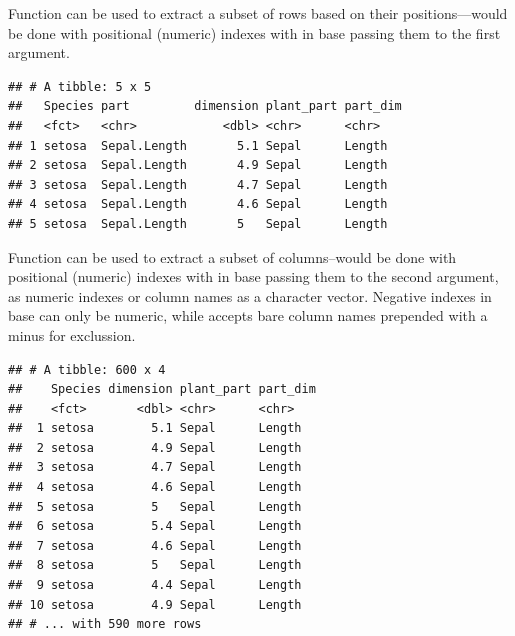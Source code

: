 \documentclass[krantz2]{krantz}\usepackage{knitr}%
\begin{document}
Function  can be used to extract a subset of rows based on their positions---would be done with positional (numeric) indexes with \code{[ , ]} in base \Rlang passing them to the first argument.

\begin{knitrout}\footnotesize
{}\color{fgcolor}\begin{kframe}
\begin{alltt}
 \hlopt{:}\hlstd{)}
\end{alltt}
\begin{verbatim}
## # A tibble: 5 x 5
##   Species part         dimension plant_part part_dim
##   <fct>   <chr>            <dbl> <chr>      <chr>   
## 1 setosa  Sepal.Length       5.1 Sepal      Length  
## 2 setosa  Sepal.Length       4.9 Sepal      Length  
## 3 setosa  Sepal.Length       4.7 Sepal      Length  
## 4 setosa  Sepal.Length       4.6 Sepal      Length  
## 5 setosa  Sepal.Length       5   Sepal      Length
\end{verbatim}
\end{kframe}
\end{knitrout}

Function  can be used to extract a subset of columns--would be done with positional (numeric) indexes with \code{[ , ]} in base \Rlang passing them to the second argument, as numeric indexes or column names as a character vector. Negative indexes in base \Rlang can only be numeric, while  accepts bare column names prepended with a minus for exclussion.

\begin{knitrout}\footnotesize
{}\color{fgcolor}\begin{kframe}
\begin{alltt}
 \hlopt{-}
\end{alltt}
\begin{verbatim}
## # A tibble: 600 x 4
##    Species dimension plant_part part_dim
##    <fct>       <dbl> <chr>      <chr>   
##  1 setosa        5.1 Sepal      Length  
##  2 setosa        4.9 Sepal      Length  
##  3 setosa        4.7 Sepal      Length  
##  4 setosa        4.6 Sepal      Length  
##  5 setosa        5   Sepal      Length  
##  6 setosa        5.4 Sepal      Length  
##  7 setosa        4.6 Sepal      Length  
##  8 setosa        5   Sepal      Length  
##  9 setosa        4.4 Sepal      Length  
## 10 setosa        4.9 Sepal      Length  
## # ... with 590 more rows
\end{verbatim}
\end{kframe}
\end{knitrout}
\end{document}
